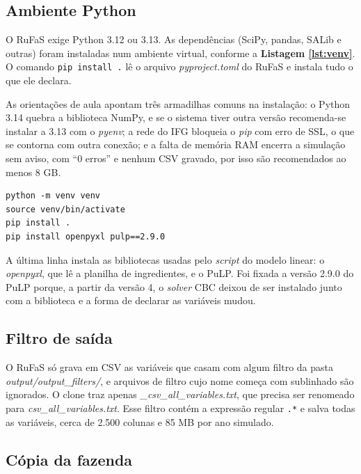 \documentclass[a4paper,12pt]{article}
\begin{document}
\subsection{Ambiente Python}

O RuFaS exige Python 3.12 ou 3.13. As dependências (SciPy, pandas, SALib e outras) foram instaladas num ambiente virtual, conforme a \textbf{Listagem \ref{lst:venv}}. O comando \texttt{pip install .} lê o arquivo \textit{pyproject.toml} do RuFaS e instala tudo o que ele declara.

As orientações de aula \cite{slides:rufas} apontam três armadilhas comuns na instalação: o Python 3.14 quebra a biblioteca NumPy, e se o sistema tiver outra versão recomenda-se instalar a 3.13 com o \textit{pyenv}; a rede do IFG bloqueia o \textit{pip} com erro de SSL, o que se contorna com outra conexão; e a falta de memória RAM encerra a simulação sem aviso, com ``0 erros'' e nenhum CSV gravado, por isso são recomendados ao menos 8 GB.

\begin{lstlisting}[caption={Criação do ambiente virtual e instalação do RuFaS.}, label={lst:venv}]
python -m venv venv
source venv/bin/activate
pip install .
pip install openpyxl pulp==2.9.0
\end{lstlisting}

A última linha instala as bibliotecas usadas pelo \textit{script} do modelo linear: o \textit{openpyxl}, que lê a planilha de ingredientes, e o PuLP. Foi fixada a versão 2.9.0 do PuLP porque, a partir da versão 4, o \textit{solver} CBC deixou de ser instalado junto com a biblioteca e a forma de declarar as variáveis mudou.

\subsection{Filtro de saída}

O RuFaS só grava em CSV as variáveis que casam com algum filtro da pasta \textit{output/output\_filters/}, e arquivos de filtro cujo nome começa com sublinhado são ignorados. O clone traz apenas \textit{\_csv\_all\_variables.txt}, que precisa ser renomeado para \textit{csv\_all\_variables.txt}. Esse filtro contém a expressão regular \texttt{.*} e salva todas as variáveis, cerca de 2.500 colunas e 85 MB por ano simulado.

\subsection{Cópia da fazenda}
\end{document}
